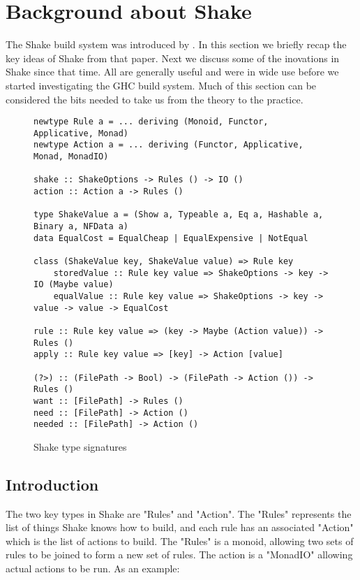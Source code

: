 \section{Background about Shake\label{sec:shake}}

The Shake build system was introduced by \citet{shake}. In this section we briefly recap the key ideas of Shake from that paper. Next we discuss some of the inovations in Shake since that time. All are generally useful and were in wide use before we started investigating the GHC build system. Much of this section can be considered the bits needed to take us from the theory to the practice.

\begin{figure}
\begin{lstlisting}
newtype Rule a = ... deriving (Monoid, Functor, Applicative, Monad)
newtype Action a = ... deriving (Functor, Applicative, Monad, MonadIO)

shake :: ShakeOptions -> Rules () -> IO ()
action :: Action a -> Rules ()

type ShakeValue a = (Show a, Typeable a, Eq a, Hashable a, Binary a, NFData a)
data EqualCost = EqualCheap | EqualExpensive | NotEqual

class (ShakeValue key, ShakeValue value) => Rule key
    storedValue :: Rule key value => ShakeOptions -> key -> IO (Maybe value)
    equalValue :: Rule key value => ShakeOptions -> key -> value -> value -> EqualCost

rule :: Rule key value => (key -> Maybe (Action value)) -> Rules ()
apply :: Rule key value => [key] -> Action [value]

(?>) :: (FilePath -> Bool) -> (FilePath -> Action ()) -> Rules ()
want :: [FilePath] -> Rules ()
need :: [FilePath] -> Action ()
needed :: [FilePath] -> Action ()
\end{lstlisting}
\caption{Shake type signatures}
\end{figure}

\subsection{Introduction}

The two key types in Shake are \lst"Rules" and \lst"Action". The \lst"Rules" represents the list of things Shake knows how to build, and each rule has an associated \lst"Action" which is the list of actions to build. The \lst"Rules" is a monoid, allowing two sets of rules to be joined to form a new set of rules. The action is a \lst"MonadIO" allowing actual actions to be run. As an example:

